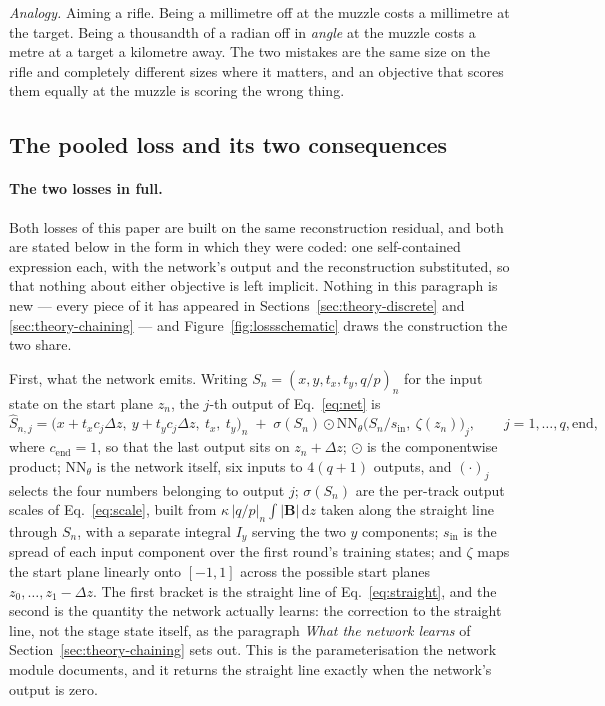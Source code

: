 \documentclass[11pt,a4paper]{article}
\begin{document}
\emph{Analogy.} Aiming a rifle. Being a millimetre off at the muzzle costs a
millimetre at the target. Being a thousandth of a radian off in \emph{angle} at
the muzzle costs a metre at a target a kilometre away. The two mistakes are the
same size on the rifle and completely different sizes where it matters, and an
objective that scores them equally at the muzzle is scoring the wrong thing.

\subsection{The pooled loss and its two consequences}
\label{sec:theory-pooled}

\paragraph{The two losses in full.} Both losses of this paper are built on the
same reconstruction residual, and both are stated below in the form in which
they were coded: one self-contained expression each, with the network's output
and the reconstruction substituted, so that nothing about either objective is
left implicit. Nothing in this paragraph is new --- every piece of it has
appeared in Sections~\ref{sec:theory-discrete} and \ref{sec:theory-chaining}
--- and Figure~\ref{fig:lossschematic} draws the construction the two share.

First, what the network emits. Writing $S_n = (x, y, t_x, t_y, q/p)_n$ for the
input state on the start plane $z_n$, the $j$-th output of
Eq.~\eqref{eq:net} is
%
\begin{equation}
  \hat{S}_{n,j} =
    \big(x + t_x c_j \Delta z,\ y + t_y c_j \Delta z,\ t_x,\ t_y\big)_n
    \;+\; \sigma(S_n) \odot
      \mathrm{NN}_\theta\!\big(S_n / s_{\mathrm{in}},\ \zeta(z_n)\big)_j,
  \qquad j = 1, \dots, q, \mathrm{end},
  \label{eq:netparam}
\end{equation}
%
where $c_{\mathrm{end}} = 1$, so that the last output sits on
$z_n + \Delta z$; $\odot$ is the componentwise product; $\mathrm{NN}_\theta$ is
the network itself, six inputs to $4(q+1)$ outputs, and $(\cdot)_j$ selects the
four numbers belonging to output $j$; $\sigma(S_n)$ are the per-track output
scales of Eq.~\eqref{eq:scale}, built from
$\kappa\,|q/p|_n \int |\mathbf{B}|\,\mathrm{d}z$ taken along the straight line
through $S_n$, with a separate integral $I_y$ serving the two $y$ components;
$s_{\mathrm{in}}$ is the spread of each input component over the first round's
training states; and $\zeta$ maps the start plane linearly onto $[-1, 1]$
across the possible start planes $z_0, \dots, z_1 - \Delta z$. The first
bracket is the straight line of Eq.~\eqref{eq:straight}, and the second is the
quantity the network actually learns: the correction to the straight line, not
the stage state itself, as the paragraph \emph{What the network learns} of
Section~\ref{sec:theory-chaining} sets out. This is the parameterisation the
network module documents, and it returns the straight line exactly when the
network's output is zero.
\end{document}
